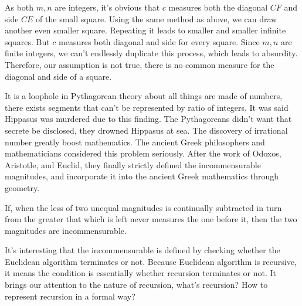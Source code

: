 \documentclass{article}
\begin{document}
As both $m, n$ are integers, it's obvious that $c$ measures both the diagonal $CF$ and side $CE$ of the small square. Using the same method as above, we can draw another even smaller square. Repeating it leads to smaller and smaller infinite squares. But $c$ measures both diagonal and side for every square. Since $m, n$ are finite integers, we can't endlessly duplicate this process, which leads to absurdity. Therefore, our assumption is not true, there is no common measure for the diagonal and side of a square.

It is a loophole in Pythagorean theory about all things are made of numbers, there exists segments that can't be represented by ratio of integers. It was said Hippasus was murdered due to this finding. The Pythagoreans didn't want that secrete be disclosed, they drowned Hippasus at sea. The discovery of irrational number greatly boost mathematics. The ancient Greek philosophers and mathematicians considered this problem seriously. After the work of Odoxos, Aristotle, and Euclid, they finally strictly defined the incommensurable magnitudes, and incorporate it into the ancient Greek mathematics through geometry.

\begin{proposition}
If, when the less of two unequal magnitudes is continually subtracted in turn from the greater that which is left never measures the one before it, then the two magnitudes are incommensurable.
\end{proposition}

It's interesting that the incommensurable is defined by checking whether the Euclidean algorithm terminates or not. Because Euclidean algorithm is recursive, it means the condition is essentially whether recursion terminates or not. It brings our attention to the nature of recursion, what's recursion? How to represent recursion in a formal way?

\begin{Exercise}
\end{Exercise}
\end{document}
